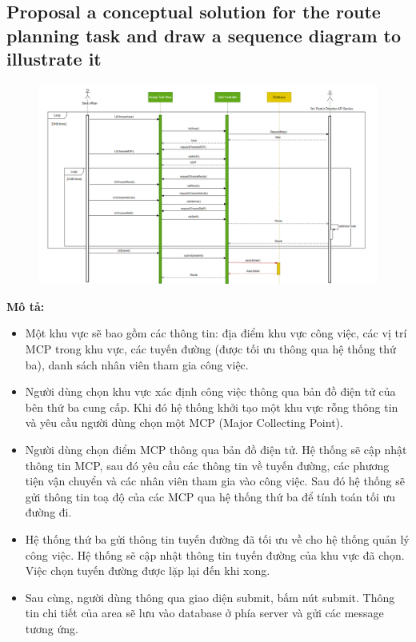 \documentclass[a4paper]{article}
\begin{document}
\subsection{Proposal a conceptual solution for the route planning task and draw a sequence diagram to illustrate it}
\newpage
\begin{figure}[!h]
    \begin{center}
      \includegraphics[width=\textwidth]{Image/sdRoute.png}
    \end{center}
\end{figure}
\textbf{Mô tả:}
\begin{itemize}
    \item Một khu vực sẽ bao gồm các thông tin: địa điểm khu vực công việc, các vị trí MCP trong khu vực, các tuyến đường (được tối ưu thông qua hệ thống thứ ba), danh sách nhân viên tham gia công việc.
    \item Người dùng chọn khu vực xác định công việc thông qua bản đồ điện tử của bên thứ ba cung cấp. Khi đó hệ thống khởi tạo một khu vực rỗng thông tin và yêu cầu người dùng chọn một MCP (Major Collecting Point).
    \item Người dùng chọn điểm MCP thông qua bản đồ điện tử. Hệ thống sẽ cập nhật thông tin MCP, sau đó yêu cầu các thông tin về tuyến đường, các phương tiện vận chuyển và các nhân viên tham gia vào công việc. Sau đó hệ thống sẽ gửi thông tin toạ độ của các MCP qua hệ thống thứ ba để tính toán tối ưu đường đi.
    \item Hệ thống thứ ba gửi thông tin tuyến đường đã tối ưu về cho hệ thống quản lý công việc. Hệ thống sẽ cập nhật thông tin tuyến đường của khu vực đã chọn. Việc chọn tuyến đường được lặp lại đến khi xong.
    \item Sau cùng, người dùng thông qua giao diện submit, bấm nút submit. Thông tin chi tiết của area sẽ lưu vào database ở phía server và gửi các message tương ứng.
\end{itemize}
\end{document}
